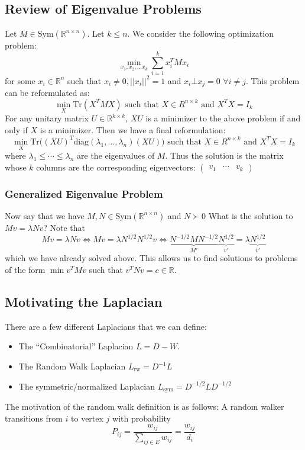 \subsection{Review of Eigenvalue Problems}

Let $M\in \text{Sym}(\mathbb{R}^{n \times n})$. Let $k \leq n$. We consider the following optimization problem:
$$\min_{x_1,x_2,...x_k} \sum_{i = 1}^k x_i^TMx_i$$
for some $x_i \in \mathbb{R}^n$ such that $x_i \neq 0, ||x_i||^2 = 1$ and $x_i \bot x_j = 0$  $\forall i \neq j$. This problem can be reformulated as:
$$\min_X \text{Tr}(X^T M X) \text{ such that } X \in R^{n \times k} \text{ and } X^TX = I_k$$
For any unitary matrix $U\in \mathbb{R}^{k\times k}$, $XU$ is a minimizer to the above problem if and only if $X$ is a minimizer. Then we have a final reformulation:
$$\min_X \text{Tr}\big((XU)^T \text{diag}(\lambda_1,\ldots,\lambda_n) (XU)\big) \text{ such that } X \in R^{n \times k} \text{ and } X^TX = I_k$$
where $\lambda_1\leq\cdots\leq\lambda_n$ are the eigenvalues of $M$. Thus the solution is the matrix whose $k$ columns are the corresponding eigenvectors: $\begin{pmatrix}v_1 &\cdots&v_k \end{pmatrix}$

\subsubsection{Generalized Eigenvalue Problem} Now say that we have $M,N\in\text{Sym}(\mathbb{R}^{n\times n})$ and $N\succ 0$ What is the solution to $Mv=\lambda Nv$? Note that
$$Mv=\lambda Nv \Leftrightarrow Mv=\lambda N^{1/2}N^{1/2}v \Leftrightarrow \underbrace{N^{-1/2}MN^{-1/2}}_{M'}\underbrace{N^{1/2}}_{v'}=\lambda\underbrace{N^{1/2}}_{v'}$$
which we have already solved above. This allows us to find solutions to problems of the form $\min v^TMv$ such that $v^TNv=c\in\mathbb{R}$.

\subsection{Motivating the Laplacian}
There are a few different Laplacians that we can define:
\begin{itemize}
\item The ``Combinatorial'' Laplacian $L = D - W$. 
\item The Random Walk Laplacian $L_{\text{rw}} = D^{-1}L$
\item The symmetric/normalized Laplacian $L_{\text{sym}}=D^{-1/2} L D^{-1/2}$
\end{itemize}
The motivation of the random walk definition is as follows: A random walker transitions from $i$ to vertex $j$ with probability 
$$P_{ij} = \frac{w_{ij}}{\sum_{ij \in E} w_{ij}} = \frac{w_{ij}}{d_i}$$

